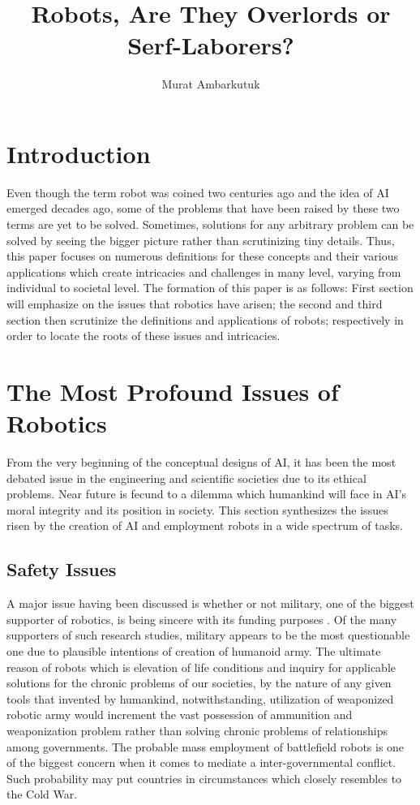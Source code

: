 \documentclass[man]{apa6}
\title{Robots, Are They Overlords or Serf-Laborers?}
\author{Murat Ambarkutuk}
\affiliation{English Language Institute, University of Delaware \\ murata@udel.
edu}
\begin{document}
\maketitle

\section{Introduction}
Even though the term robot was coined two centuries ago and the idea of AI emerged decades ago, some of the problems that have been raised by these two terms are yet to be solved.
Sometimes, solutions for any arbitrary problem can be solved by seeing the bigger picture rather than scrutinizing tiny details.
Thus, this paper focuses on numerous definitions for these concepts and their various applications which create intricacies and challenges in many level, varying from individual to societal level.
The formation of this paper is as follows: First section will emphasize on the issues that robotics have arisen; the second and third section then scrutinize the definitions and applications of robots; respectively in order to locate the roots of these issues and intricacies.

\section{The Most Profound Issues of Robotics}
From the very beginning of the conceptual designs of AI, it has been the most debated issue in the engineering and scientific societies due to its ethical problems.
Near future is fecund to a dilemma which humankind will face in AI's moral integrity and its position in society.
This section synthesizes the issues risen by the creation of AI and employment robots in a wide spectrum of tasks.

\subsection{Safety Issues}
A major issue having been discussed is whether or not military, one of the biggest supporter of robotics, is being sincere with its funding purposes \cite{gre}.
Of the many supporters of such research studies, military appears to be the most questionable one due to plausible intentions of creation of humanoid army.
The ultimate reason of robots which is elevation of life conditions and inquiry for applicable solutions for the chronic problems of our societies, by the nature of any given tools that invented by humankind, notwithstanding, utilization of weaponized robotic army would increment the vast possession of ammunition and weaponization problem rather than solving chronic problems of relationships among governments.
The probable mass employment of battlefield robots is one of the biggest concern when it comes to mediate a inter-governmental conflict. Such probability may put countries in circumstances which closely resembles to the Cold War. \par
\end{document}
